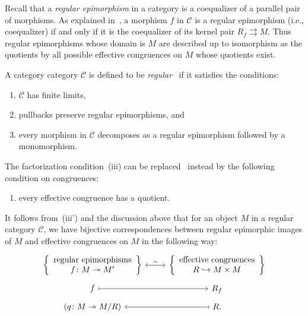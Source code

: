 \documentclass[reqno]{amsart}
\newcommand{\C}{\mathcal{C}}
\newcommand{\catC}{\mathcal{C}}
\newcommand{\separate}{\bigskip}
\numberwithin{equation}{section}
\theoremstyle{plain}
\theoremstyle{definition}
\begin{document}
Recall that a \emph{regular epimorphism} in a category is a coequalizer of a parallel pair of morphisms. 
As explained in~\cite[Proposition~2.5.7]{Borceux:handbook1}, a morphism $f$ in $\C$ is a regular epimorphism (i.e., coequalizer) if and only if it is the coequalizer of its kernel pair $R_f \rightrightarrows M$. 
Thus regular epimorphisms whose domain is $M$ are described up to isomorphism as the quotients by all possible effective congruences on $M$ whose quotients exist.


\separate

A category category $\C$ is defined to be \emph{regular}~\cite{Grillet:regular} if it satisfies the conditions:
\begin{enumerate}[label=\textnormal{(\roman*)}] 
\item $\C$ has finite limits, 
\item pullbacks preserve regular epimorphisms, and
\item every morphism in $\C$ decomposes as a regular epimorphism followed by a monomorphism.
\end{enumerate}
The factorization condition~(iii) can be replaced~\cite[\S 2.1]{Borceux:handbook2} instead by the following condition on congruences:
\begin{enumerate}
    \item[\textnormal{(iii')}] every effective congruence has a quotient.
\end{enumerate}
It follows from~(iii') and the discussion above that for an object $M$ in a regular category $\catC$, we have bijective correspondences between regular epimorphic images of $M$ and effective congruences on $M$ in the following way:
\begin{equation}\label{eq:quotient correspondence}
\begin{tikzcd}[row sep=tiny]
\left\{\begin{array}{c}
    \textnormal{regular epimorphisms} \\
    f \colon M \twoheadrightarrow M'
    \end{array}\right\} \ar[r, leftrightarrow, "\sim"]
    & 
\left\{\begin{array}{c}
    \textnormal{effective congruences} \\
    R \hookrightarrow M \times M
    \end{array}\right\} \\
f \ar[r, mapsto] & R_f \\
(q \colon M \twoheadrightarrow M/R) & \ar[l, mapsto] R.
\end{tikzcd}
\end{equation}
\end{document}
